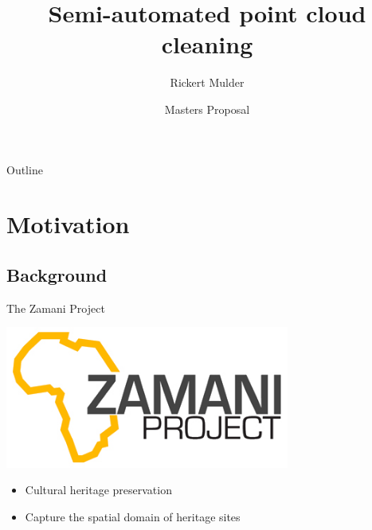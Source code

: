 \documentclass{beamer}
\title{Semi-automated point cloud cleaning}
\author{Rickert Mulder}
\institute[U of X]
{
  Department of Computer Science\\
  University of Cape Town
}
\date[CFP 2003] %
{Masters Proposal}
\begin{document}
\begin{frame}
  \titlepage
\end{frame}

\begin{frame}{Outline}
  \tableofcontents
\end{frame}





\section{Motivation}

\subsection{Background}

\begin{frame}{The Zamani Project}

  \includegraphics[width=0.70\textwidth]{pics/Zamani_logo}

  \begin{itemize}
  \item
    Cultural heritage preservation
  \item
    Capture the spatial domain of heritage sites
  \end{itemize}
\end{frame}
\end{document}
